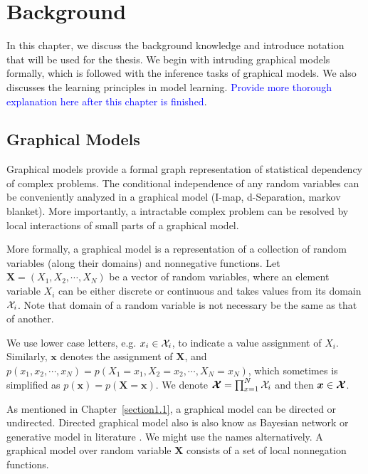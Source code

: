 \chapter{Background}
\label{chapter2}
In this chapter, we discuss the background knowledge and introduce notation that will be used for the thesis. We begin with intruding graphical models formally, which is followed with the inference tasks of graphical models. We also discusses the learning principles in model learning. \textcolor{blue}{Provide more thorough explanation here after this chapter is finished}.

\section{Graphical Models}
Graphical models provide a formal graph representation of statistical dependency of complex problems. The conditional independence of any random variables can be conveniently analyzed in a graphical model (I-map, d-Separation, markov blanket). More importantly, a intractable complex problem can be resolved by local interactions of small parts of a graphical model.

More formally, a graphical model is a representation of a collection of random variables (along their domains) and nonnegative functions. Let $\bm{X}= (X_1, X_2, \cdots, X_N)$ be a vector of random variables, where an element variable $X_i$ can be either discrete or continuous and takes values from its domain $\mathcal{X}_i$. Note that domain of a random variable is not necessary be the same as that of another.

We use lower case letters, e.g. $x_i \in \mathcal{X}_i$, to indicate a value assignment of $X_i$. Similarly, $\bm{x}$ denotes the assignment of $\bm{X}$, and $  p(x_1, x_2, \cdots, x_N) = p(X_1 = x_1, X_2 = x_2, \cdots, X_N = x_N)$,
which sometimes is simplified as $p(\bm{x})=p(\bm{X}=\bm{x})$. We denote $\bm{\mathcal{X}} = \prod_{x=1}^{N} \mathcal{X}_i$ and then $\bm{x}\in \bm{\mathcal{X}}$.

As mentioned in Chapter~\ref{section1.1}, a graphical model can be directed or undirected. Directed graphical model also is also know as Bayesian network or generative model in literature \cite[Chapter~8]{Bishop:2006:PRM:1162264}. We might use the names alternatively.
A graphical model over random variable $\bm{X}$ consists of a set of local nonnegation functions.

